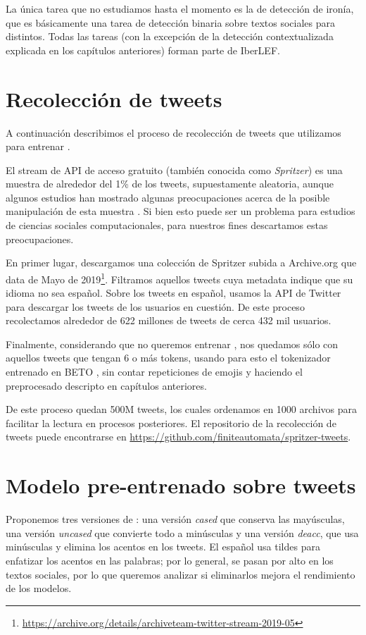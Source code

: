 La única tarea que no estudiamos hasta el momento es la de detección de ironía, que es básicamente una tarea de detección binaria sobre textos sociales para distintos. Todas las tareas (con la excepción de la detección contextualizada explicada en los capítulos anteriores) forman parte de IberLEF.

\section{Recolección de tweets}

A continuación describimos el proceso de recolección de tweets que utilizamos para entrenar \robertuito{}.

El stream de API de acceso gratuito (también conocida como \emph{Spritzer}) es una muestra de alrededor del 1\% de los tweets, supuestamente aleatoria, aunque algunos estudios han mostrado algunas preocupaciones acerca de la posible manipulación de esta muestra \cite{pfeffer2018tampering}. Si bien esto puede ser un problema para estudios de ciencias sociales computacionales, para nuestros fines descartamos estas preocupaciones.

En primer lugar, descargamos una colección de Spritzer subida a Archive.org que data de Mayo de 2019\footnote{\url{https://archive.org/details/archiveteam-twitter-stream-2019-05}}. Filtramos aquellos tweets cuya metadata indique que su idioma no sea español. Sobre los tweets en español, usamos la API de Twitter para descargar los tweets de los usuarios en cuestión. De este proceso recolectamos alrededor de 622 millones de tweets de cerca 432 mil usuarios.

Finalmente, considerando que no queremos entrenar , nos quedamos sólo con aquellos tweets que tengan 6 o más tokens, usando para esto el tokenizador entrenado en BETO \cite{canete2020spanish}, sin contar repeticiones de emojis y haciendo el preprocesado descripto en capítulos anteriores.

De este proceso quedan 500M tweets, los cuales ordenamos en 1000 archivos para facilitar la lectura en procesos posteriores. El repositorio de la recolección de tweets puede encontrarse en \url{https://github.com/finiteautomata/spritzer-tweets}.

\section{Modelo pre-entrenado sobre tweets}


Proponemos tres versiones de \robertuito{}: una versión \emph{cased} que conserva las mayúsculas, una versión \emph{uncased} que convierte todo a minúsculas y una versión \emph{deacc}, que usa minúsculas y elimina los acentos en los tweets. El español usa tildes para enfatizar los acentos en las palabras; por lo general, se pasan por alto en los textos sociales, por lo que queremos analizar si eliminarlos mejora el rendimiento de los modelos.

